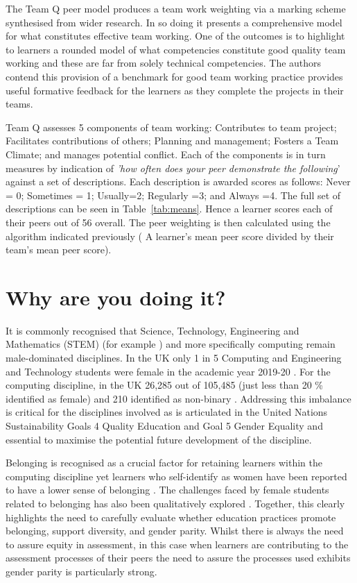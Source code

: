 \documentclass[sigconf, anonymous=true]{acmart}
\begin{document}
The Team Q peer model produces a team work weighting via a marking scheme synthesised from wider research. In so doing it presents a comprehensive model for what constitutes effective team working. One of the outcomes is to highlight to learners a rounded model of what competencies constitute good quality team working and these are far from solely technical competencies. The authors contend this provision of a benchmark for good team working practice provides useful formative feedback for the learners as they complete the projects in their teams.

Team Q \cite{Britton2017} assesses 5 components of team working: Contributes to team project; Facilitates contributions of others; Planning and management; Fosters a Team Climate; and manages potential conflict. Each of the components is in turn measures by indication of \textit{'how often does your peer demonstrate the following}' against a set of descriptions. Each description is awarded scores as follows: Never = 0; Sometimes = 1; Usually=2; Regularly =3; and Always =4. The full set of descriptions can be seen in Table~\ref{tab:means}.  Hence a learner scores each of their peers out of 56 overall. The peer weighting is then calculated using the algorithm indicated previously ( A learner's mean peer score divided by their team's mean peer score).

\section{Why are you doing it?}
It is commonly recognised that Science, Technology, Engineering and Mathematics (STEM) (for example \cite{Baird2018}) and more specifically computing remain male-dominated disciplines. In the UK only 1 in 5 Computing and Engineering and Technology students were female in the academic year 2019-20 \cite{HESA}. For the computing discipline, in the UK 26,285 out of 105,485 (just less than 20 \% identified as female) and 210 identified as non-binary \cite{HESA}. Addressing this imbalance is critical for the disciplines involved as is articulated in the United Nations Sustainability Goals 4 Quality Education and Goal 5 Gender Equality \cite{UN} and essential to maximise the potential future development of the discipline.

Belonging \cite{Veilleux2013} is recognised as a crucial factor for retaining learners within the computing discipline yet learners who self-identify as women have been reported to have a lower sense of belonging \cite{Mooney2020}. The challenges faced by female students related to belonging has also been qualitatively explored \cite{Winter2021}. Together, this clearly highlights the need to carefully evaluate whether education practices promote belonging, support diversity, and gender parity. Whilst there is always the need to assure equity in assessment, in this case when learners are contributing to the assessment processes of their peers the need to assure the processes used exhibits gender parity is particularly strong. 
\end{document}
